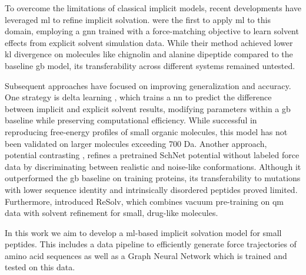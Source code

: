 To overcome the limitations of classical implicit models, recent developments have leveraged \gls{ml} to refine implicit solvation. \citet{machine_learning_implicit_solvation} were the first to apply \gls{ml} to this domain, employing a \gls{gnn} trained with a force-matching objective to learn solvent effects from explicit solvent simulation data. While their method achieved lower \gls{kl} divergence on molecules like chignolin and alanine dipeptide compared to the baseline \gls{gb} model, its transferability across different systems remained untested.

Subsequent approaches have focused on improving generalization and accuracy. One strategy is delta learning \cite{katzberger2024general, katzberger2025rapid}, which trains a \gls{nn} to predict the difference between implicit and explicit solvent results, modifying parameters within a \gls{gb} baseline while preserving computational efficiency. While successful in reproducing free-energy profiles of small organic molecules, this model has not been validated on larger molecules exceeding 700 Da. Another approach, potential contrasting \cite{Airas2023}, refines a pretrained SchNet potential without labeled force data by discriminating between realistic and noise-like conformations. Although it outperformed the \gls{gb} baseline on training proteins, its transferability to mutations with lower sequence identity and intrinsically disordered peptides proved limited. Furthermore, \citet{röcken2025predictingsolvationfreeenergies} introduced ReSolv, which combines vacuum pre-training on \gls{qm} data with solvent refinement for small, drug-like molecules.

In this work we aim to develop a ml-based implicit solvation model for small peptides. This includes a data pipeline to efficiently generate force trajectories of amino acid sequences as well as a Graph Neural Network which is trained and tested on this data.
